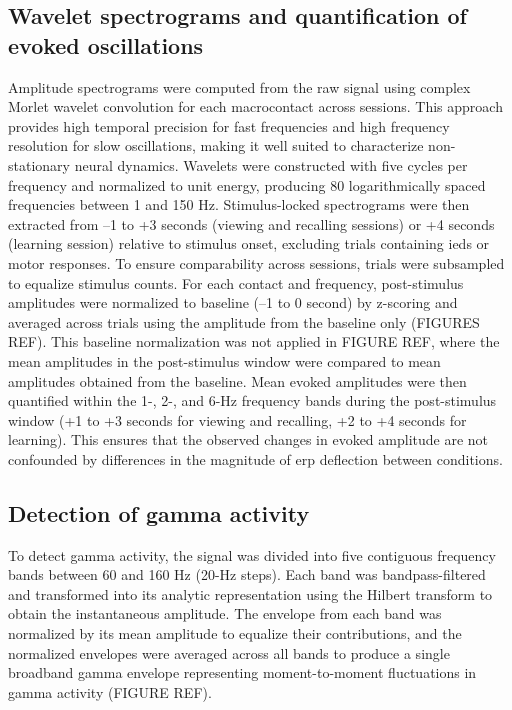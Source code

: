 \documentclass[12pt,a4paper]{report}
\newcommand{\g}[1]{\gls{#1}}     %
\newcommand{\gp}[1]{\glspl{#1}}  %
\begin{document}
\subsection{Wavelet spectrograms and quantification of evoked oscillations}
Amplitude spectrograms were computed from the raw signal using complex Morlet wavelet convolution for each macrocontact across sessions. This approach provides high temporal precision for fast frequencies and high frequency resolution for slow oscillations, making it well suited to characterize non-stationary neural dynamics. Wavelets were constructed with five cycles per frequency and normalized to unit energy, producing 80 logarithmically spaced frequencies between 1 and 150 Hz. Stimulus-locked spectrograms were then extracted from –1 to +3 seconds (viewing and recalling sessions) or +4 seconds (learning session) relative to stimulus onset, excluding trials containing \gp{ied} or motor responses. To ensure comparability across sessions, trials were subsampled to equalize stimulus counts. For each contact and frequency, post-stimulus amplitudes were normalized to baseline (–1 to 0 second) by z-scoring and averaged across trials using the amplitude from the baseline only (FIGURES REF). This baseline normalization was not applied in FIGURE REF, where the mean amplitudes in the post-stimulus window were compared to mean amplitudes obtained from the baseline. Mean evoked amplitudes were then quantified within the 1-, 2-, and 6-Hz frequency bands during the post-stimulus window (+1 to +3 seconds for viewing and recalling, +2 to +4 seconds for learning). This ensures that the observed changes in evoked amplitude are not confounded by differences in the magnitude of \g{erp} deflection between conditions.

\subsection{Detection of gamma activity}
To detect gamma activity, the signal was divided into five contiguous frequency bands between 60 and 160 Hz (20-Hz steps). Each band was bandpass-filtered and transformed into its analytic representation using the Hilbert transform to obtain the instantaneous amplitude. The envelope from each band was normalized by its mean amplitude to equalize their contributions, and the normalized envelopes were averaged across all bands to produce a single broadband gamma envelope representing moment-to-moment fluctuations in gamma activity (FIGURE REF).
\end{document}
